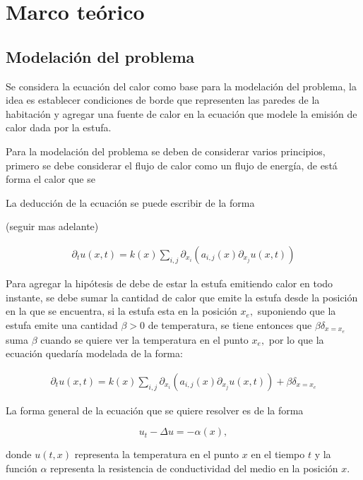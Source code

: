 \documentclass[12pt,paperletter]{article}
\begin{document}
\newpage
\section{Marco teórico}

\subsection{Modelación del problema}
Se considera la ecuación del calor como base para la modelación del problema, la idea es establecer condiciones de borde que representen las paredes de la habitación y agregar una fuente de calor en la ecuación que modele la emisión de calor dada por la estufa. 

Para la modelación del problema se deben de considerar varios principios, primero se debe considerar el flujo de calor como un flujo de energía, de está forma el calor que se 


La deducción de la ecuación se puede escribir de la forma 

(seguir mas adelante)

\begin{align}
    \partial_t u(x,t) = k(x) \sum_{i,j} \partial_{x_i} (a_{i,j} (x) \partial_{x_j} u(x,t) )
\end{align}

Para agregar la hipótesis de debe de estar la estufa emitiendo calor en todo instante, se debe sumar la cantidad de calor que emite la estufa desde la posición en la que se encuentra, si la estufa esta en la posición $x_e,$ suponiendo que la estufa emite una cantidad $\beta >0$ de temperatura, se tiene entonces que $\beta \delta_{x = x_e}$ suma $\beta$ cuando se quiere ver la temperatura en el punto $x_e,$ por lo que la ecuación quedaría modelada de la forma:

\begin{align}
    \partial_t u(x,t) = k(x) \sum_{i,j} \partial_{x_i} (a_{i,j} (x) \partial_{x_j} u(x,t) ) + \beta \delta_{x = x_e}
\end{align}


La forma general de la ecuación que se quiere resolver es de la forma 

\begin{equation}
\label{eqn:principal}
u_t - \Delta u = - \alpha (x),
\end{equation}
  
donde $u(t,x)$ representa la temperatura en el punto $x$ en el tiempo $t$ y la función $\alpha$ representa la resistencia de conductividad del medio en la posición $x.$   
\end{document}
